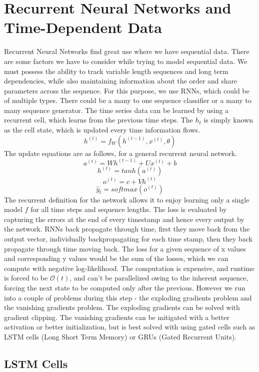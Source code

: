 \documentclass{article}
\begin{document}
\section{Recurrent Neural Networks and Time-Dependent Data}

Recurrent Neural Networks find great use where we have sequential data. There are some factors we have to consider while trying to model sequential data. We must possess the ability to track variable length sequences and long term dependencies, while also maintaining information about the order and share parameters across the sequence. For this purpose, we use RNNs, which could be of multiple types. There could be a many to one sequence classifier or a many to many sequence generator. The time series data can be learned by using a recurrent cell, which learns from the previous time steps. The $h_t$ is simply known as the cell state, which is updated every time information flows.
$$h^{(t)} = f_W(h^{(t-1)}, x^{(t)}, \theta)$$
The update equations are as follows, for a general recurrent neural network.
$$a^{(t)} = W h^{(t-1)} + U x^{(t)} + b$$ 
$$h^{(t)} = tanh(a^{(t)})$$
$$o^{(t)} = c + V h^{(t)}$$
$$\hat{y}_t = softmax(o^{(t)})$$
The recurrent definition for the network allows it to enjoy learning only a single model $f$ for all time steps and sequence lengths. 
The loss is evaluated by capturing the errors at the end of every timestamp and hence every output by the network. RNNs back propagate through time, first they move back from the output vector, individually backpropagating for each time stamp, then they back propagate through time moving back. The loss for a given sequence of x values and corresponding y values would be the sum of the losses, which we can compute with negative log-likelihood. The computation is expensive, and runtime is forced to be $\mathcal{O}(t)$, and can't be parallelized owing to the inherent sequence, forcing the next state to be computed only after the previous. However we run into a couple of problems during this step - the exploding gradients problem and the vanishing gradients problem. The exploding gradients can be solved with gradient clipping. The vanishing gradients can be mitigated with a better activation or better initialization, but is best solved with using gated cells such as LSTM cells (Long Short Term Memory) or GRUs (Gated Recurrent Units). 

\subsection{LSTM Cells}
\end{document}
